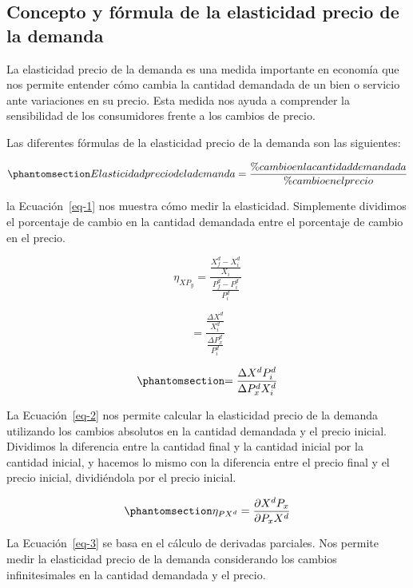 \documentclass[
  jou,
  floatsintext,
  longtable,
  a4paper,
  nolmodern,
  notxfonts,
  notimes,
  colorlinks=true,linkcolor=blue,citecolor=blue,urlcolor=blue]{apa7}
\begin{document}
\subsection{Concepto y fórmula de la elasticidad precio de la
demanda}\label{concepto-y-fuxf3rmula-de-la-elasticidad-precio-de-la-demanda}

La elasticidad precio de la demanda es una medida importante en economía
que nos permite entender cómo cambia la cantidad demandada de un bien o
servicio ante variaciones en su precio. Esta medida nos ayuda a
comprender la sensibilidad de los consumidores frente a los cambios de
precio.

Las diferentes fórmulas de la elasticidad precio de la demanda son las
siguientes:

\begin{equation}\phantomsection\label{eq-1}{
Elasticidad precio de la demanda =\frac{\% cambio en la cantidad demandada}{\% cambio en el precio}
}\end{equation}

la Ecuación~\ref{eq-1} nos muestra cómo medir la elasticidad.
Simplemente dividimos el porcentaje de cambio en la cantidad demandada
entre el porcentaje de cambio en el precio.

\[
\eta _{XP_y} = \frac{\frac {X_f^d - X_i^d}{X_i}}{\frac {P_f^d - P_i^d}{P_i^d}}
\]

\[
= \frac{\frac{\Delta X^d}{X_i^d}}{\frac{\Delta P_x^d}{P_i^d}}
\]

\begin{equation}\phantomsection\label{eq-2}{
= \frac{\Delta X^d P_i^d}{\Delta P_x^d X_i^d}
}\end{equation}

La Ecuación~\ref{eq-2} nos permite calcular la elasticidad precio de la
demanda utilizando los cambios absolutos en la cantidad demandada y el
precio inicial. Dividimos la diferencia entre la cantidad final y la
cantidad inicial por la cantidad inicial, y hacemos lo mismo con la
diferencia entre el precio final y el precio inicial, dividiéndola por
el precio inicial.

\begin{equation}\phantomsection\label{eq-3}{
\eta _{PX^d} = \frac{\partial X^d P_x}{\partial P_x X^d}
}\end{equation}

La Ecuación~\ref{eq-3} se basa en el cálculo de derivadas parciales. Nos
permite medir la elasticidad precio de la demanda considerando los
cambios infinitesimales en la cantidad demandada y el precio.
\end{document}
